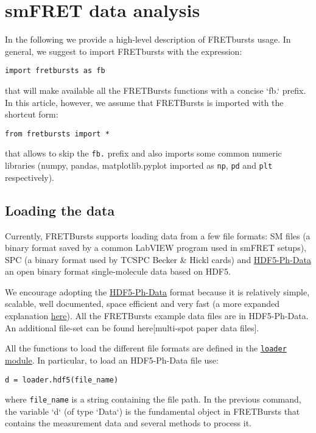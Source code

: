 \section{smFRET data analysis}

In the following we provide a high-level description of FRETbursts usage. In general, we suggest to import FRETbursts with the expression:

\verb|import fretbursts as fb|

that will make available all the FRETBursts functions with a concise `fb.` prefix. In this article, however, we assume that FRETBursts is imported with the shortcut form:

\verb|from fretbursts import *|

that allows to skip the \verb|fb.| prefix and also imports some common numeric libraries (numpy, pandas, matplotlib.pyplot imported as \verb|np|, \verb|pd| and \verb|plt| respectively).

\subsection{Loading the data}
Currently, FRETBursts supports loading data from a few file formats: SM files (a binary format saved by a common LabVIEW program used in smFRET setups), SPC (a binary format used by TCSPC Becker & Hickl cards) and \href{https://github.com/tritemio/FRETBursts/wiki/HDF5-Ph-Data-format-0.2-Draft}{HDF5-Ph-Data}  an open binary format single-molecule data based on HDF5.

We encourage adopting the \href{https://github.com/tritemio/FRETBursts/wiki/HDF5-Ph-Data-format-0.2-Draft}{HDF5-Ph-Data} format because it is relatively simple, scalable, well documented, space efficient and very fast (a more expanded explanation \href{http://fretbursts.readthedocs.org/en/latest/HDF5_format.html}{here}). All the FRETBursts example data files are in HDF5-Ph-Data. An additional file-set can be found here[multi-spot paper data files].

All the functions to load the different file formats are defined in the \href{http://fretbursts.readthedocs.org/en/latest/loader.html}{\verb|loader| module}. In particular, to load an HDF5-Ph-Data file use:

\verb|d = loader.hdf5(file_name)|

where \verb|file_name| is a string containing the file path. In the previous command, the variable `d` (of type `Data`) is the fundamental object in FRETBursts that contains the measurement data and several methods to process it.


